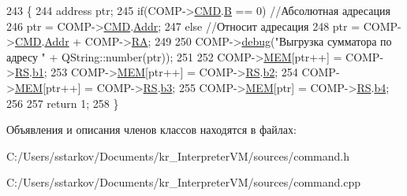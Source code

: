 \begin{DoxyCode}
243 \{
244     address ptr;
245     \textcolor{keywordflow}{if}(COMP->\hyperlink{class_computer_a8423168f7cc356b4dd36977603798caf}{CMD}.\hyperlink{struct_computer_1_1command_a3e0d1e527de9f60594023a362b08a7de}{B} == 0) \textcolor{comment}{//Абсолютная адресация}
246         ptr =  COMP->\hyperlink{class_computer_a8423168f7cc356b4dd36977603798caf}{CMD}.\hyperlink{struct_computer_1_1command_a0e07591012953413797506f7bc3cb1a7}{Addr};
247     \textcolor{keywordflow}{else} \textcolor{comment}{//Относит адресация}
248         ptr = COMP->\hyperlink{class_computer_a8423168f7cc356b4dd36977603798caf}{CMD}.\hyperlink{struct_computer_1_1command_a0e07591012953413797506f7bc3cb1a7}{Addr} + COMP->\hyperlink{class_computer_a499d0b2c857c2977dd5702906705f79e}{RA};
249 
250     COMP->\hyperlink{class_computer_a10ca6c6b200630119201de16d7368e0f}{debug}(\textcolor{stringliteral}{"Выгрузка сумматора по адресу "} + QString::number(ptr));
251 
252     COMP->\hyperlink{class_computer_adcd1bd438b7ad95f043db2acbbd864ae}{MEM}[ptr++] = COMP->\hyperlink{class_computer_a874503110664b3cf821118d2ce9c2b96}{RS}.\hyperlink{union_computer_1_1data_a4308eb86abfec2d52028212c599a093b}{b1};
253     COMP->\hyperlink{class_computer_adcd1bd438b7ad95f043db2acbbd864ae}{MEM}[ptr++] = COMP->\hyperlink{class_computer_a874503110664b3cf821118d2ce9c2b96}{RS}.\hyperlink{union_computer_1_1data_a87252409c780b1c387883eb027065709}{b2};
254     COMP->\hyperlink{class_computer_adcd1bd438b7ad95f043db2acbbd864ae}{MEM}[ptr++] = COMP->\hyperlink{class_computer_a874503110664b3cf821118d2ce9c2b96}{RS}.\hyperlink{union_computer_1_1data_af9265f845319a83f5877590e7ab2a497}{b3};
255     COMP->\hyperlink{class_computer_adcd1bd438b7ad95f043db2acbbd864ae}{MEM}[ptr] = COMP->\hyperlink{class_computer_a874503110664b3cf821118d2ce9c2b96}{RS}.\hyperlink{union_computer_1_1data_aca2c60d7da9da79750a6d3a237dae93c}{b4};
256 
257     \textcolor{keywordflow}{return} 1;
258 \}
\end{DoxyCode}


Объявления и описания членов классов находятся в файлах\+:\begin{DoxyCompactItemize}
\item 
C\+:/\+Users/sstarkov/\+Documents/kr\+\_\+\+Interpreter\+V\+M/sources/command.\+h\item 
C\+:/\+Users/sstarkov/\+Documents/kr\+\_\+\+Interpreter\+V\+M/sources/command.\+cpp\end{DoxyCompactItemize}
